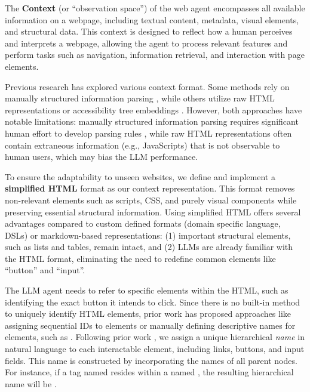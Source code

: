 \documentclass{article} %
\begin{document}
The \textbf{Context} (or ``observation space'') of the web agent encompasses all available information on a webpage, including textual content, metadata, visual elements, and structural data. This context is designed to reflect how a human perceives and interprets a webpage, allowing the agent to process relevant features and perform tasks such as navigation, information retrieval, and interaction with page elements.  

Previous research has explored various context format. Some methods rely on manually structured information parsing \cite{yaoWebShopScalableRealWorld2022}, while others utilize raw HTML representations \cite{gurRealWorldWebAgentPlanning2023} or accessibility tree embeddings \cite{zhouWebArenaRealisticWeb2024}. However, both approaches have notable limitations: manually structured information parsing requires significant human effort to develop parsing rules \cite{yaoWebShopScalableRealWorld2022}, while raw HTML representations often contain extraneous information (e.g., JavaScripts) that is not observable to human users, which may bias the LLM performance.  

To ensure the adaptability to unseen websites, we define and implement a \textbf{simplified HTML} format as our context representation. This format removes non-relevant elements such as scripts, CSS, and purely visual components while preserving essential structural information. Using simplified HTML offers several advantages compared to custom defined formats (domain specific language, DSLs) or markdown-based representations: (1) important structural elements, such as lists and tables, remain intact, and (2) LLMs are already familiar with the HTML format, eliminating the need to redefine common elements like ``button'' and ``input''.

The LLM agent needs to refer to specific elements within the HTML, such as identifying the exact button it intends to click. Since there is no built-in method to uniquely identify HTML elements, prior work has proposed approaches like assigning sequential IDs to elements \cite{kohVisualWebArenaEvaluatingMultimodal2024} or manually defining descriptive names for elements, such as  \cite{yaoWebShopScalableRealWorld2022}. Following prior work \cite{luUXAgentLLMAgentBased2025}, we assign a unique hierarchical \textit{name} in natural language to each interactable element, including links, buttons, and input fields. This name is constructed by incorporating the names of all parent nodes. For instance, if a  tag named  resides within a  named , the resulting hierarchical name will be .
\end{document}
